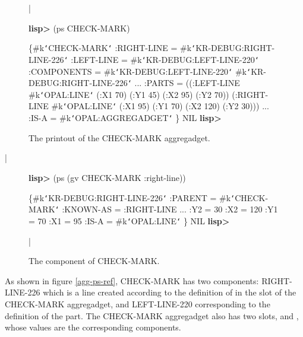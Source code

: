 \begin{group}
\begin{figure}
\bar{}
\begin{programexample}

{\bf lisp>} (ps CHECK-MARK)

\{\#k{\tt\char`\<}CHECK-MARK{\tt\char`\>}
  :RIGHT-LINE = \#k{\tt\char`\<}KR-DEBUG:RIGHT-LINE-226{\tt\char`\>}
  :LEFT-LINE = \#k{\tt\char`\<}KR-DEBUG:LEFT-LINE-220{\tt\char`\>}
  :COMPONENTS = \#k{\tt\char`\<}KR-DEBUG:LEFT-LINE-220{\tt\char`\>} \#k{\tt\char`\<}KR-DEBUG:RIGHT-LINE-226{\tt\char`\>}
  ...
  :PARTS = ((:LEFT-LINE \#k{\tt\char`\<}OPAL:LINE{\tt\char`\>}
                        (:X1 70) (:Y1 45) (:X2 95) (:Y2 70))
            (:RIGHT-LINE \#k{\tt\char`\<}OPAL:LINE{\tt\char`\>}
                         (:X1 95) (:Y1 70) (:X2 120) (:Y2 30)))
  ...
  :IS-A = \#k{\tt\char`\<}OPAL:AGGREGADGET{\tt\char`\>}
\}
NIL
{\bf lisp>}
\end{programexample}
\caption{The printout of the CHECK-MARK aggregadget.}
\end{figure}
\end{group}

\bar{}

\begin{figure}
\begin{programexample}

{\bf lisp>} (ps (gv CHECK-MARK :right-line))

\{\#k{\tt\char`\<}KR-DEBUG:RIGHT-LINE-226{\tt\char`\>}
  :PARENT =  \#k{\tt\char`\<}CHECK-MARK{\tt\char`\>}
  :KNOWN-AS =  :RIGHT-LINE
  ...
  :Y2 =  30
  :X2 =  120
  :Y1 =  70
  :X1 =  95
  :IS-A =  \#k{\tt\char`\<}OPAL:LINE{\tt\char`\>}
\}
NIL
{\bf lisp>}

\end{programexample}
\caption{The  component of CHECK-MARK.}
\bar{}
\end{figure}

As shown in figure \ref{agg-ps-ref}, CHECK-MARK has two components:
RIGHT-LINE-226 which is a line created according to the definition of
 in the  slot of the CHECK-MARK
aggregadget, and LEFT-LINE-220 corresponding to the definition of the
 part.  The CHECK-MARK
aggregadget also has two slots,  and , whose
values are the corresponding components.


